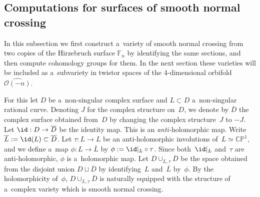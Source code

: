 \subsection{Computations for surfaces of smooth normal crossing}
\label{ss:sncs}

In this subsection we f\/irst construct a~variety of smooth normal crossing from two copies of the Hirzebruch surface
$\mathbb{F}_n$ by identifying the same sections, and then compute cohomology groups for them.
In the next section these varieties will be included as a~subvariety in twistor spaces of the 4-dimensional orbifold
$\widehat{\mathscr O(-n)}$.

For this let $D$ be a~non-singular complex surface and $L\subset D$ a~non-singular rational curve.
Denoting $J$ for the complex structure on~$D$, we denote by $\overline D$ the complex surface obtained from~$D$ by
changing the complex structure~$J$ to $-J$.
Let $\id :D\to \overline D$ be the identity map.
This is an {\em anti-}holomorphic map.
Write $\overline L:=\id(L)\subset \overline D$.
Let $\tau:L\to L$ be an anti-holomorphic involutions of~$L\simeq\mathbb{CP}^1$, and we def\/ine a~map
$\phi:L\to\overline L$ by $\phi:=\id|_{L}\circ\tau$.
Since both~$\id|_{L}$ and~$\tau$ are anti-holomorphic, $\phi$ is a~holomorphic map.
Let $D\cup_{L,\tau}\overline D$ be the space obtained from the disjoint union $D\sqcup \overline D$ by identifying~$L$
and~$\overline L$ by~$\phi$.
By the holomorphicity of~$\phi$, $D\cup_{L,\tau}\overline D$ is naturally equipped with the structure of a~complex
variety which is smooth normal crossing.

